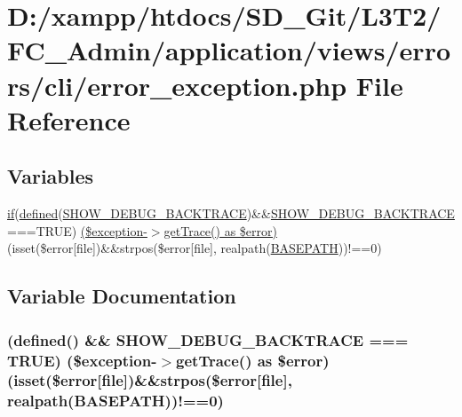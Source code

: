 \hypertarget{cli_2error__exception_8php}{}\section{D\+:/xampp/htdocs/\+S\+D\+\_\+\+Git/\+L3\+T2/\+F\+C\+\_\+\+Admin/application/views/errors/cli/error\+\_\+exception.php File Reference}
\label{cli_2error__exception_8php}
\subsection*{Variables}
\begin{DoxyCompactItemize}
\item 
\hyperlink{assets_2js_2bootstrap_8min_8js_a87cf461060832b8b68a7b48d9e371e4f}{if}(\hyperlink{_bootstrap_8php_a46458e8654a714e0565e20f63021add9}{defined}(\textquotesingle{}\hyperlink{constants_8php_a7e2dd6fea73799257285946411aeb5ce}{S\+H\+O\+W\+\_\+\+D\+E\+B\+U\+G\+\_\+\+B\+A\+C\+K\+T\+R\+A\+C\+E}\textquotesingle{})\&\&\hyperlink{constants_8php_a7e2dd6fea73799257285946411aeb5ce}{S\+H\+O\+W\+\_\+\+D\+E\+B\+U\+G\+\_\+\+B\+A\+C\+K\+T\+R\+A\+C\+E}===T\+R\+U\+E) \hyperlink{cli_2error__exception_8php_a58b3444cff3fa104c28c2111a147e3d3}{(\$exception-\/$>$get\+Trace() as \$error)} (isset(\$error\mbox{[}\textquotesingle{}file\textquotesingle{}\mbox{]})\&\&strpos(\$error\mbox{[}\textquotesingle{}file\textquotesingle{}\mbox{]}, realpath(\hyperlink{index_8php_ad39801cabfd338dc5524466fe793fda9}{B\+A\+S\+E\+P\+A\+T\+H}))!==0)
\end{DoxyCompactItemize}


\subsection{Variable Documentation}
\hypertarget{cli_2error__exception_8php_a58b3444cff3fa104c28c2111a147e3d3}{}
\subsubsection[{(\$exception-\/$>$get\+Trace() as \$error)}]{({\bf defined}(\textquotesingle{}) \&\& {\bf S\+H\+O\+W\+\_\+\+D\+E\+B\+U\+G\+\_\+\+B\+A\+C\+K\+T\+R\+A\+C\+E} === T\+R\+U\+E) (\$exception-\/$>$get\+Trace() as \$error)(isset(\$error\mbox{[}\textquotesingle{}file\textquotesingle{}\mbox{]})\&\&strpos(\$error\mbox{[}\textquotesingle{}file\textquotesingle{}\mbox{]}, realpath({\bf B\+A\+S\+E\+P\+A\+T\+H}))!==0)}\label{cli_2error__exception_8php_a58b3444cff3fa104c28c2111a147e3d3}
